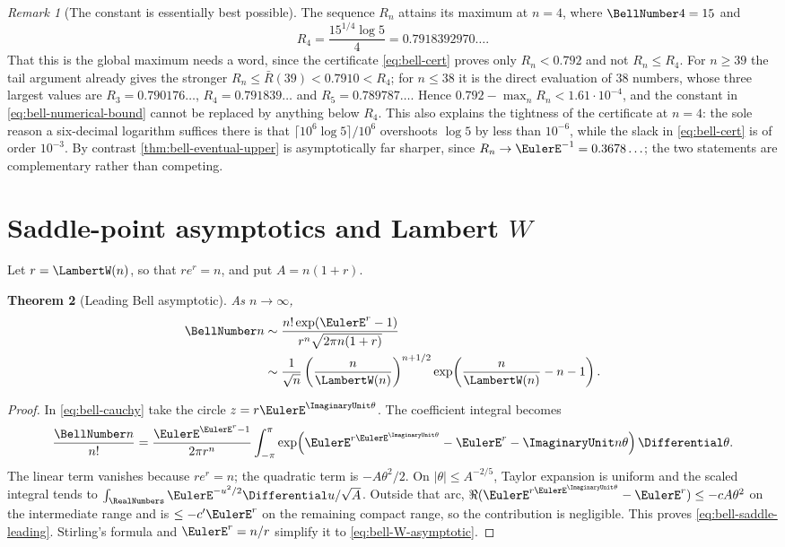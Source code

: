 \documentclass[11pt,a4paper,oneside,openany]{book}
\newtheorem{theorem}{Theorem}[chapter]
\theoremstyle{definition}
\theoremstyle{remark}
\newtheorem{remark}[theorem]{Remark}
\begin{document}
\begin{remark}[The constant is essentially best possible]
The sequence $R_n$ attains its maximum at $n=4$, where $\BellNumber4=15$ and
\begin{equation}
 R_4=\frac{15^{1/4}\log5}{4}=0.7918392970\ldots.                  \label{eq:bell-max-ratio}
\end{equation}
That this is the global maximum needs a word, since the certificate
\eqref{eq:bell-cert} proves only $R_n<0.792$ and not $R_n\le R_4$.  For
$n\ge39$ the tail argument already gives the stronger
$R_n\le\bar R(39)<0.7910<R_4$; for $n\le38$ it is the direct evaluation of
$38$ numbers, whose three largest values are
$R_3=0.790176\ldots$, $R_4=0.791839\ldots$ and $R_5=0.789787\ldots$.  Hence
$0.792-\max_nR_n<1.61\cdot10^{-4}$, and the constant in
\eqref{eq:bell-numerical-bound} cannot be replaced by anything below
$R_4$.  This also explains the tightness of the certificate at $n=4$: the
sole reason a six-decimal logarithm suffices there is that
$\lceil10^6\log5\rceil/10^6$ overshoots $\log5$ by less than $10^{-6}$, while
the slack in \eqref{eq:bell-cert} is of order $10^{-3}$.  By contrast
\cref{thm:bell-eventual-upper} is asymptotically far sharper, since
$R_n\to\EulerE^{-1}=0.3678\ldots$; the two statements are complementary rather
than competing.
\end{remark}

\section{Saddle-point asymptotics and Lambert \texorpdfstring{$W$}{W}}
Let $r=\LambertW(n)$, so that $re^r=n$, and put $A=n(1+r)$.
\begin{theorem}[Leading Bell asymptotic]\label{thm:bell-leading-asymptotic}
As $n\to\infty$,
\begin{align}
 \BellNumber n
 &\sim \frac{n!\exp(\EulerE^r-1)}{r^n\sqrt{2\pi n(1+r)}}
 \label{eq:bell-saddle-leading}\\
 &\sim \frac1{\sqrt n}\left(\frac{n}{\LambertW(n)}\right)^{n+1/2}
       \exp\!\left(\frac{n}{\LambertW(n)}-n-1\right).
 \label{eq:bell-W-asymptotic}
\end{align}
\end{theorem}
\begin{proof}
In \eqref{eq:bell-cauchy} take the circle $z=r\EulerE^{\ImaginaryUnit\theta}$.  The coefficient
integral becomes
\[
 \frac{\BellNumber n}{n!}=
 \frac{\EulerE^{\EulerE^r-1}}{2\pi r^n}
 \int_{-\pi}^{\pi}
 \exp\!\left(\EulerE^{r\EulerE^{\ImaginaryUnit\theta}}-\EulerE^r-\ImaginaryUnit n\theta\right)\Differential\theta.
\]
The linear term vanishes because $re^r=n$; the quadratic term is
$-A\theta^2/2$.  On $|\theta|\le A^{-2/5}$, Taylor expansion is uniform and the
scaled integral tends to $\int_{\RealNumbers}\EulerE^{-u^2/2}\Differential u/\sqrt A$.  Outside that arc,
$\Re(\EulerE^{r\EulerE^{\ImaginaryUnit\theta}}-\EulerE^r)\le-cA\theta^2$ on the intermediate range and is
$\le-c'\EulerE^r$ on the remaining compact range, so the contribution is negligible.
This proves \eqref{eq:bell-saddle-leading}.  Stirling's formula and $\EulerE^r=n/r$
simplify it to \eqref{eq:bell-W-asymptotic}.
\end{proof}
\end{document}
